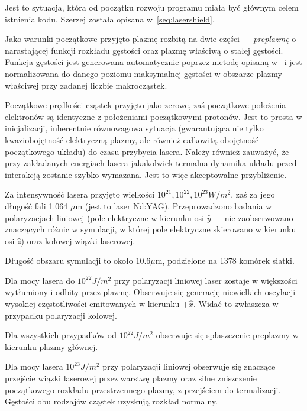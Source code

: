 Jest to sytuacja, która od początku rozwoju programu miała być głównym celem istnienia kodu. Szerzej została opisana w~\ref{seq:lasershield}.

Jako warunki początkowe przyjęto plazmę rozbitą na dwie części ---
\emph{preplazmę} o narastającej funkcji rozkładu gęstości oraz plazmę właściwą
o stałej gęstości. Funkcja gęstości jest generowana automatycznie poprzez
metodę opisaną w~\cite{birdsall} i jest normalizowana do danego poziomu
maksymalnej gęstości w obszarze plazmy właściwej przy zadanej liczbie
makrocząstek.

Początkowe prędkości cząstek przyjęto jako zerowe, zaś początkowe położenia
elektronów są identyczne z położeniami początkowymi protonów. Jest to prosta
w inicjalizacji, inherentnie równowagowa sytuacja (gwarantująca nie tylko
kwaziobojętność elektryczną plazmy, ale również całkowitą obojętność
początkowego układu) do czasu przybycia lasera. Należy również zauważyć, że
przy zakładanych energiach lasera jakakolwiek termalna dynamika układu przed
interakcją zostanie szybko wymazana. Jest to więc akceptowalne przybliżenie.

Za intensywność lasera przyjęto wielkości $10^{21}, 10^{22}, 10^{23} W/m^2$,
zaś za jego długość fali 1.064 $\mu$m (jest to laser Nd:YAG). Przeprowadzono
badania w polaryzacjach liniowej (pole elektryczne w kierunku osi $\hat{y}$ ---
nie zaobserwowano znaczących różnic w symulacji, w której pole elektryczne
skierowano w kierunku osi $\hat{z}$)
oraz kołowej wiązki laserowej.

Długość obszaru symulacji to około $10.6 \mu$m, podzielone na 1378 komórek siatki.

Dla mocy lasera do $10^{22} J/m^2$ przy polaryzacji liniowej %
laser zostaje w większości wytłumiony i odbity przez plazmę. Obserwuje się generację niewielkich oscylacji wysokiej częstotliwości emitowanych w kierunku $+\hat{x}$.
Widać to zwłaszcza w przypadku polaryzacji kołowej.

Dla wszystkich przypadków od $10^{22} J/m^2$ obserwuje się spłaszczenie preplazmy w kierunku plazmy głównej.



Dla mocy lasera $10^{23} J/m^2$ przy polaryzacji liniowej %
obserwuje się znaczące przejście wiązki laserowej przez warstwę plazmy oraz silne zniszczenie początkowego rozkładu przestrzennego plazmy, z przejściem do termalizacji.
Gęstości obu rodzajów cząstek uzyskują rozkład normalny.

